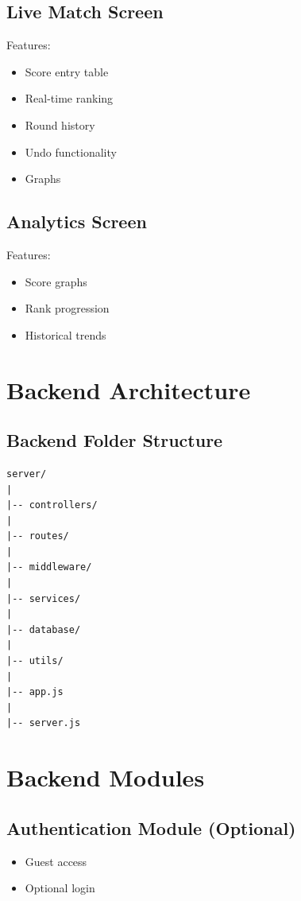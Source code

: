 \documentclass[11pt,a4paper]{article}
\begin{document}
\subsection{Live Match Screen}
Features:
\begin{itemize}
    \item Score entry table
    \item Real-time ranking
    \item Round history
    \item Undo functionality
    \item Graphs
\end{itemize}

\subsection{Analytics Screen}
Features:
\begin{itemize}
    \item Score graphs
    \item Rank progression
    \item Historical trends
\end{itemize}

\section{Backend Architecture}

\subsection{Backend Folder Structure}

\begin{lstlisting}[basicstyle=\ttfamily\small]
server/
|
|-- controllers/
|
|-- routes/
|
|-- middleware/
|
|-- services/
|
|-- database/
|
|-- utils/
|
|-- app.js
|
|-- server.js
\end{lstlisting}

\section{Backend Modules}

\subsection{Authentication Module (Optional)}
\begin{itemize}
    \item Guest access
    \item Optional login
\end{itemize}
\end{document}
